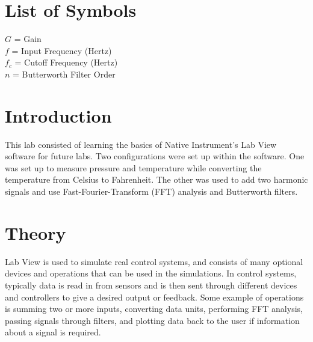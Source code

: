 \documentclass[12pt]{article}
\begin{document}

\tableofcontents

\listoffigures

\bigskip


\section*{\fontsize{12}{12}\selectfont \large List of Symbols}
$G$ = Gain\\
$f$ = Input Frequency (Hertz)\\
$f_{c}$ = Cutoff Frequency (Hertz)\\
$n$ = Butterworth Filter Order\\



\newpage



\section*{\fontsize{12}{12}\selectfont \large Introduction}
This lab consisted of learning the  basics of Native Instrument's Lab View software for future labs. Two configurations were set up within the software. One was set up to measure pressure and temperature while converting the temperature from Celsius to Fahrenheit. The other was used to add two harmonic signals and use Fast-Fourier-Transform (FFT) analysis and Butterworth filters.


\section*{\fontsize{12}{12}\selectfont \large Theory}
Lab View is used to simulate real control systems, and consists of many optional devices and operations that can be used in the simulations. In control systems, typically data is read in from sensors and is then sent through different devices and controllers to give a desired output or feedback. Some example of operations is summing two or more inputs, converting data units, performing FFT analysis, passing signals through filters, and plotting data back to the user if information about a signal is required.
\bigskip
\end{document}
